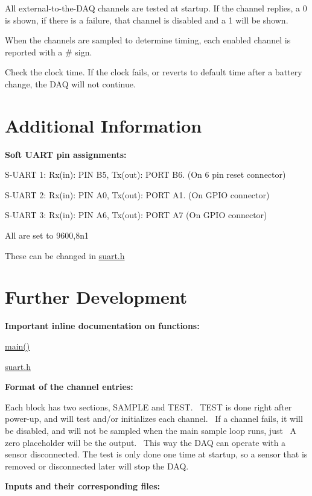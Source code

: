 All external-\/to-\/the-\/\-D\-A\-Q channels are tested at startup. If the channel replies, a 0 is shown, if there is a failure, that channel is disabled and a 1 will be shown.

When the channels are sampled to determine timing, each enabled channel is reported with a \# sign.

Check the clock time. If the clock fails, or reverts to default time after a battery change, the D\-A\-Q will not continue. \par
 \hypertarget{index_five}{}\section{Additional Information}\label{index_five}
{\bfseries Soft U\-A\-R\-T pin assignments\-:}\par
 S-\/\-U\-A\-R\-T 1\-: Rx(in)\-: P\-I\-N B5, Tx(out)\-: P\-O\-R\-T B6. (On 6 pin reset connector)\par
 S-\/\-U\-A\-R\-T 2\-: Rx(in)\-: P\-I\-N A0, Tx(out)\-: P\-O\-R\-T A1. (On G\-P\-I\-O connector)\par
 S-\/\-U\-A\-R\-T 3\-: Rx(in)\-: P\-I\-N A6, Tx(out)\-: P\-O\-R\-T A7 (On G\-P\-I\-O connector)\par
 All are set to 9600,8n1\par
 These can be changed in \hyperlink{suart_8h}{suart.\-h} \hypertarget{index_six}{}\section{Further Development}\label{index_six}
{\bfseries Important inline documentation on functions\-: \par
 } \hyperlink{main_8c_ae66f6b31b5ad750f1fe042a706a4e3d4}{main()}\par
 \hyperlink{suart_8h}{suart.\-h}\par
 {\bfseries Format of the channel entries\-: \par
 }Each block has two sections, S\-A\-M\-P\-L\-E and T\-E\-S\-T.~ T\-E\-S\-T is done right after power-\/up, and will test and/or initializes each channel.~ If a channel fails, it will be disabled, and will not be sampled when the main sample loop runs, just~ A zero placeholder will be the output.~ This way the D\-A\-Q can operate with a sensor disconnected. The test is only done one time at startup, so a sensor that is removed or disconnected later will stop the D\-A\-Q.~ \par
 \par
 {\bfseries Inputs and their corresponding files\-:}   
